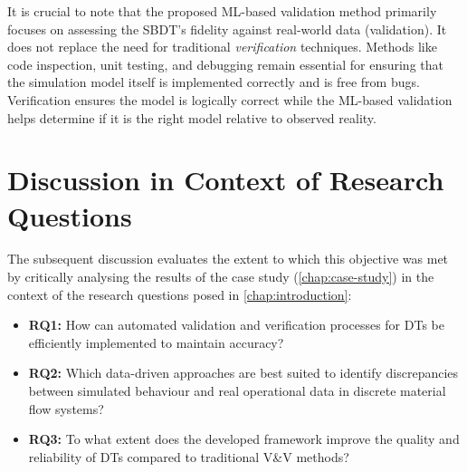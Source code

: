 It is crucial to note that the proposed ML-based validation method primarily focuses on assessing the SBDT's fidelity against real-world data (validation). It does not replace the need for traditional \textit{verification} techniques. Methods like code inspection, unit testing, and debugging remain essential for ensuring that the simulation model itself is implemented correctly and is free from bugs. Verification ensures the model is logically correct while the ML-based validation helps determine if it is the right model relative to observed reality.

\section{Discussion in Context of Research Questions}
\label{sec:discussion_rqs}
The subsequent discussion evaluates the extent to which this objective was met by critically analysing the results of the case study (\autoref{chap:case-study}) in the context of the research questions posed in \autoref{chap:introduction}:
\begin{itemize}
  \item \textbf{RQ1:} How can automated validation and verification processes for DTs be efficiently implemented to maintain accuracy?
  \item \textbf{RQ2:} Which data-driven approaches are best suited to identify discrepancies between simulated behaviour and real operational data in discrete material flow systems?
  \item \textbf{RQ3:} To what extent does the developed framework improve the quality and reliability of DTs compared to traditional V\&V methods?
\end{itemize}

